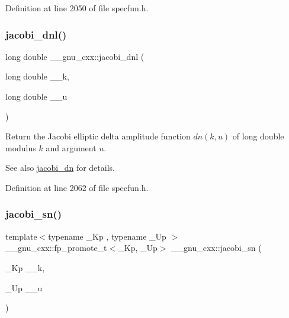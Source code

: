 Definition at line 2050 of file specfun.\+h.

\mbox{\label{group__gnu__math__spec__func_gae59786991abbf8359deef49b6323065a}} 
\subsubsection{\texorpdfstring{jacobi\+\_\+dnl()}{jacobi\_dnl()}}
{\footnotesize\ttfamily long double \+\_\+\+\_\+gnu\+\_\+cxx\+::jacobi\+\_\+dnl (\begin{DoxyParamCaption}\item[{long double}]{\+\_\+\+\_\+k,  }\item[{long double}]{\+\_\+\+\_\+u }\end{DoxyParamCaption})\hspace{0.3cm}{\ttfamily [inline]}}

Return the Jacobi elliptic delta amplitude function $ dn(k,u) $ of {\ttfamily long double} modulus $ k $ and argument $ u $.

\begin{DoxySeeAlso}{See also}
\hyperlink{group__gnu__math__spec__func_ga0f8fa8d6a77dbc2089d65f3f16876aa9}{jacobi\+\_\+dn} for details. 
\end{DoxySeeAlso}


Definition at line 2062 of file specfun.\+h.

\mbox{\label{group__gnu__math__spec__func_ga49d5e18152dd0dd0f496b8c8582e7045}} 
\subsubsection{\texorpdfstring{jacobi\+\_\+sn()}{jacobi\_sn()}}
{\footnotesize\ttfamily template$<$typename \+\_\+\+Kp , typename \+\_\+\+Up $>$ \\
\+\_\+\+\_\+gnu\+\_\+cxx\+::fp\+\_\+promote\+\_\+t$<$\+\_\+\+Kp, \+\_\+\+Up$>$ \+\_\+\+\_\+gnu\+\_\+cxx\+::jacobi\+\_\+sn (\begin{DoxyParamCaption}\item[{\+\_\+\+Kp}]{\+\_\+\+\_\+k,  }\item[{\+\_\+\+Up}]{\+\_\+\+\_\+u }\end{DoxyParamCaption})\hspace{0.3cm}{\ttfamily [inline]}}

